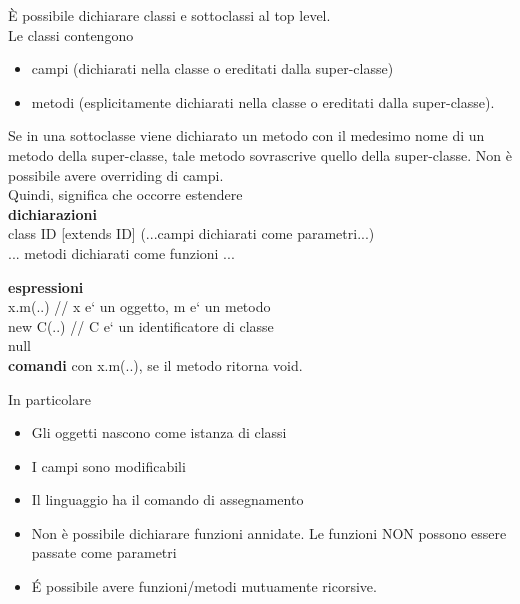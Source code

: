 \documentclass[a4paper]{article}   %
\begin{document}
È possibile dichiarare classi e sottoclassi  al top level.\\
Le classi contengono
  \begin{itemize}
    \item campi (dichiarati nella classe o ereditati dalla super-classe)
    \item metodi (esplicitamente dichiarati nella classe o ereditati dalla super-classe).
  \end{itemize}
Se in una sottoclasse viene dichiarato un metodo con il medesimo nome
di un metodo della super-classe, tale metodo sovrascrive quello della
super-classe. Non è possibile avere overriding di campi.\\
Quindi, significa che occorre estendere\\


\textbf{dichiarazioni}\\

   class ID [extends ID] (...campi dichiarati come parametri...) {\\

     ... metodi dichiarati come funzioni ...\\

   }

\textbf{espressioni}\\

   x.m(..)          // x e` un oggetto, m e` un metodo\\

   new C(..)				// C e` un identificatore di classe\\

   null\\

\textbf{comandi} con x.m(..), se il metodo ritorna void.

In particolare

\begin{itemize}

  \item Gli oggetti nascono come istanza di classi
  \item I campi sono modificabili
  \item Il linguaggio ha il comando di assegnamento
  \item Non è possibile dichiarare funzioni annidate. Le funzioni NON possono
    essere passate come parametri
  \item É possibile avere funzioni/metodi mutuamente ricorsive.

\end{itemize}
\end{document}
